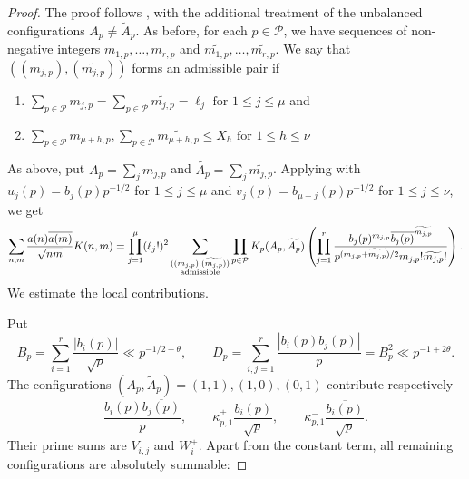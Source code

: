 \documentclass[oneside, 12pt]{amsart}
\theoremstyle{definition}
\begin{document}
	\begin{proof}
		{The proof follows
			, with the additional
			treatment of the unbalanced configurations
			$A_p\ne\widetilde A_p$.}  As before, for each $p\in \mathcal{P}$, we have sequences of non-negative integers $m_{1,p},\dots,m_{r,p}$ and $\widetilde{m_{1,p}},\dots,\widetilde{m_{r,p}}$. We say that $((m_{j,p}), (\widetilde{m_{j,p}}))$ forms an admissible pair if
		\begin{enumerate}
			\item $\sum_{p \in \mathcal{P}} m_{j,p}=\sum_{p \in \mathcal{P}} \widetilde{m_{j,p}} = \ell_j \text{ for } 1\leq j \leq \mu$ and 
			\item $\sum_{p \in \mathcal{P}} m_{\mu+h,p}, \sum_{p \in \mathcal{P}} \widetilde{m_{\mu+h,p}} \leq X_h \text{ for } 1 \leq h \leq \nu$
		\end{enumerate}
		{As above, put} $A_p = \sum_{j} m_{j,p}$ and $\widetilde{A_p} = \sum_j \widetilde{m_{j,p}}$. Applying  with $u_j(p)=b_j(p)p^{-1/2}$ for $1\leq j \leq \mu$ and $v_j(p)=b_{\mu+j}(p)p^{-1/2}$ for $1\leq j \leq \nu$, we get 
		$$\sum_{n,m} \frac{a(n)\overline{a(m)}}{\sqrt{nm}}K(n,m) = \prod_{j=1}^{\mu} (\ell_j!)^2 \sum_{\substack{((m_{j,p}), (\widetilde{m_{j,p}})) \\ \textup{admissible}}} \prod_{p \in \mathcal{P}} K_p(A_p,\widetilde{A_p})\left(\prod_{j=1}^r \frac{b_j(p)^{m_{j,p}}\overline{b_j(p)}^{\widetilde{m_{j,p}}}}{p^{(m_{j,p}+\widetilde{m_{j,p}})/2}m_{j,p}!\widetilde{m_{j,p}}!}\right).$$
		We estimate the local contributions.
		
		Put
		\[
		B_p=\sum_{i=1}^r\frac{|b_i(p)|}{\sqrt p}\ll p^{-1/2+\theta},
		\qquad
		D_p=\sum_{i,j=1}^r\frac{|b_i(p)b_j(p)|}{p}
		=B_p^2\ll p^{-1+2\theta}.
		\]
		The configurations $(A_p,\widetilde A_p)=(1,1),(1,0),(0,1)$ contribute
		respectively
		\[
		\frac{b_i(p)\overline{b_j(p)}}p,\qquad
		\kappa_{p,1}^+\frac{b_i(p)}{\sqrt p},\qquad
		\kappa_{p,1}^-\frac{\overline{b_i(p)}}{\sqrt p}.
		\]
		Their prime sums are $V_{i,j}$ and $W_i^\pm$.
		Apart from the constant term, all remaining configurations are absolutely summable:
		

\end{proof}
\end{document}

